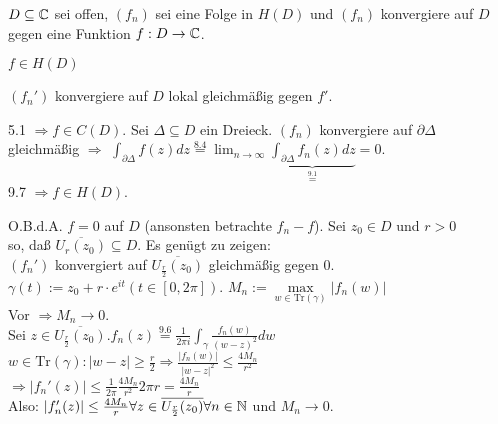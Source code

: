 \documentclass[a4paper,twoside,DIV15,BCOR12mm]{scrbook}
\def\Tr{\text{Tr}}
\begin{document}
\begin{satz}
$D \subseteq \mathbb{C}$ sei offen, $(f_n)$ sei eine Folge in $H(D)$ und $(f_n)$ konvergiere auf $D$  gegen eine Funktion $f: D \rightarrow \mathbb{C}$.
\begin{liste}
\item $f \in H(D)$
\item $(f_n')$ konvergiere auf $D$ lokal gleichmäßig gegen $f'$.
\end{liste}
\end{satz}

\begin{beweis}
\begin{liste}
\item 5.1 $\Rightarrow f \in C(D)$. Sei $\Delta \subseteq D$ ein Dreieck. $(f_n)$ konvergiere auf $\partial\Delta$ \\
gleichmäßig $\Rightarrow$ $\int_{\partial\Delta} f(z) dz \stackrel{8.4}{=} \lim_{n\to\infty}\underbrace{\int_{\partial\Delta}f_n(z) dz}_{\stackrel{9.1}{=}}= 0$.\\
9.7 $\Rightarrow f \in H(D)$.
\item O.B.d.A. $f = 0$ auf $D$ (ansonsten betrachte $f_n - f$). Sei $z_0 \in D$ und $r > 0$ \\
so, daß $\overline{U_r(z_0)} \subseteq D$. Es genügt zu zeigen: \\
$(f_n')$ konvergiert auf $\overline{U_{\frac{r}{2}}(z_0)}$ gleichmäßig gegen $0$.\\
$\gamma (t) := z_0 + r \cdot e^{it} (t \in [0,2\pi])$. $M_n := \max\limits _{w \in \Tr(\gamma)} |f_n(w)|$\\
Vor $\Rightarrow M_n \to 0$.\\
Sei $z \in \overline{U_{\frac{r}{2}}(z_0)}. f_n (z) \stackrel{9.6}{=} \frac{1}{2 \pi i} \int_{\gamma} \frac{f_n(w)}{(w-z)^2}dw$\\
$w \in \Tr(\gamma) : |w-z| \geq \frac{r}{2} \Rightarrow \frac{|f_n(w)|}{|w-z|^2} \leq \frac{4 M_n}{r^2}$\\
$\Rightarrow |f_n ' (z)| \leq \frac{1}{2\pi} \frac{4 M_n}{r^2} 2 \pi r = \frac{4 M_n}{r}$\\
Also: $|f_n'(z)| \leq \frac{4 M_n}{r} \forall z \in \overline{U_{\frac{r}{2}}(z_0)} \forall n \in \mathbb{N}$ und $M_n \to 0$.
\end{liste}
\end{beweis}
\end{document}
